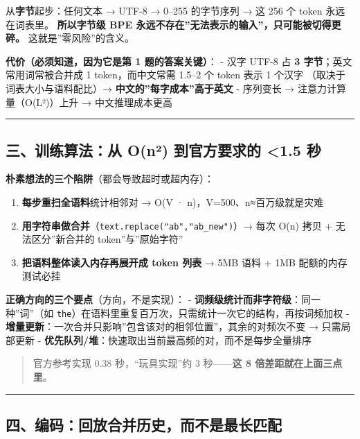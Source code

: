 \documentclass[
  chinese,
  11pt,
]{ctexart}
\providecommand{\tightlist}{%
  \setlength{\itemsep}{0pt}\setlength{\parskip}{0pt}}
\begin{document}
从\textbf{字节}起步：任何文本 → UTF-8 → 0--255 的字节序列 → 这 256 个 token 永远在词表里。 \textbf{所以字节级 BPE 永远不存在''无法表示的输入''，只可能被切得更碎。} 这就是''零风险''的含义。

\textbf{代价（必须知道，因为它是第 1 题的答案关键）}： - 汉字 UTF-8 占 \textbf{3 字节}；英文常用词常被合并成 1 token，而中文常需 1.5--2 个 token 表示 1 个汉字 （取决于词表大小与语料配比）→ \textbf{中文的''每字成本''高于英文} - 序列变长 → 注意力计算量（O(L²)）上升 → 中文推理成本更高

\begin{center}\rule{0.5\linewidth}{0.5pt}\end{center}

\subsection{三、训练算法：从 O(n²) 到官方要求的 \textless1.5 秒}\label{ux4e09ux8badux7ec3ux7b97ux6cd5ux4ece-onuxb2-ux5230ux5b98ux65b9ux8981ux6c42ux7684-1.5-ux79d2}

\textbf{朴素想法的三个陷阱}（都会导致超时或超内存）：

\begin{enumerate}
\def\labelenumi{\arabic{enumi}.}
\tightlist
\item
  \textbf{每步重扫全语料}统计相邻对 → O(V · n)，V=500、n≈百万级就是灾难
\item
  \textbf{用字符串做合并}（\texttt{text.replace("ab","ab\_new")}）→ 每次 O(n) 拷贝 + 无法区分''新合并的 token''与''原始字符''
\item
  \textbf{把语料整体读入内存再展开成 token 列表} → 5MB 语料 + 1MB 配额的内存测试必挂
\end{enumerate}

\textbf{正确方向的三个要点}（方向，不是实现）： - \textbf{词频级统计而非字符级}：同一种''词''（如 \texttt{the}）在语料里重复百万次，只需统计一次它的结构，再按词频加权 - \textbf{增量更新}：一次合并只影响''包含该对的相邻位置''，其余的对频次不变 → 只需局部更新 - \textbf{优先队列/堆}：快速取出当前最高频的对，而不是每步全量排序

\begin{quote}
官方参考实现 0.38 秒，``玩具实现''约 3 秒------\textbf{这 8 倍差距就在上面三点里}。
\end{quote}

\begin{center}\rule{0.5\linewidth}{0.5pt}\end{center}

\subsection{四、编码：回放合并历史，而不是最长匹配}\label{ux56dbux7f16ux7801ux56deux653eux5408ux5e76ux5386ux53f2ux800cux4e0dux662fux6700ux957fux5339ux914d}
\end{document}
